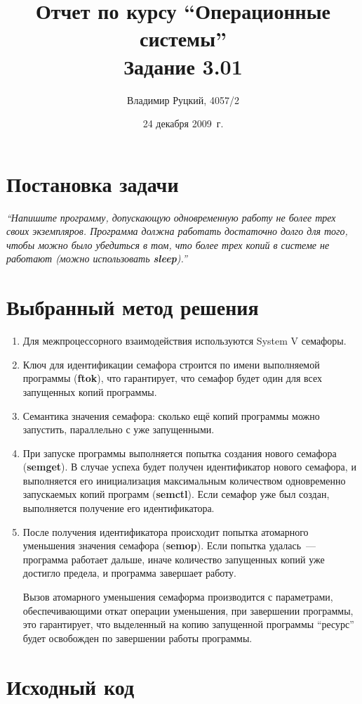 \documentclass[a4paper,12pt]{article}
\title{Отчет по курсу ``Операционные системы'' \\ Задание 3.01}
\author{Владимир Руцкий, 4057/2}
\date{24 декабря 2009~г.}
\newcommand{\commandquote}[1]{\textbf{#1}}
\begin{document}
\maketitle

\section*{Постановка задачи}
\textit{``Напишите программу, допускающую одновременную работу не более трех
своих экземпляров. Программа должна работать достаточно долго для того,
чтобы можно было убедиться в том, что более трех копий в системе не
работают (можно использовать \commandquote{sleep}).''}

\section*{Выбранный метод решения}
\begin{enumerate}
 \item[] Для межпроцессорного взаимодействия используются System V семафоры.
 \item[] Ключ для идентификации семафора строится по имени выполняемой программы 
(\commandquote{ftok}), что гарантирует, что семафор будет один для всех запущенных копий программы.
 \item[] Семантика значения семафора: сколько ещё копий программы можно запустить, 
параллельно с уже запущенными.
 \item При запуске программы выполняется попытка создания нового семафора (\commandquote{semget}). 
В случае успеха будет получен идентификатор нового семафора, и выполняется
его инициализация максимальным количеством одновременно запускаемых копий программ 
(\commandquote{semctl}).
Если семафор уже был создан, выполняется получение его идентификатора. 
 \item После получения идентификатора происходит попытка атомарного уменьшения значения семафора 
(\commandquote{semop}). Если попытка удалась~--- программа работает дальше, 
иначе количество запущенных копий уже достигло предела, и программа завершает работу.

Вызов атомарного уменьшения семаформа производится с параметрами, обеспечивающими откат операции уменьшения, 
при завершении программы, это гарантирует, что выделенный на копию запущенной программы ``ресурс'' будет
освобожден по завершении работы программы.
\end{enumerate}

\section*{Исходный код}
\lstset{language=C, caption=task\_3\_01.c,%
label=source-code, basicstyle=\footnotesize,%
numbers=left, numberstyle=\footnotesize, numbersep=5pt, frame=single, breaklines=true, breakatwhitespace=false,%
inputencoding=utf8x}

\end{document}
